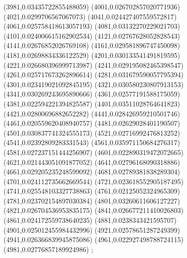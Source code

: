 {(3981,0.03435722855488059)
(4001,0.026702857020771936)
(4021,0.0299706567067073)
(4041,0.024427407559572817)
(4061,0.025758418613057193)
(4081,0.03132270229021703)
(4101,0.024006615162902534)
(4121,0.02767628052828543)
(4141,0.02676852026769108)
(4161,0.029581896747450098)
(4181,0.02698834336122529)
(4201,0.030133541491819595)
(4221,0.026680396999713987)
(4241,0.029195082465398547)
(4261,0.025717673262896614)
(4281,0.031679590057795394)
(4301,0.023419021092845195)
(4321,0.030580230807913153)
(4341,0.030269243695890666)
(4361,0.02577191588175059)
(4381,0.022594221394825587)
(4401,0.03511028764641823)
(4421,0.02800696882652282)
(4441,0.028426959210501746)
(4461,0.020559620408940757)
(4481,0.02629028401190507)
(4501,0.030837741324555173)
(4521,0.02716992476813252)
(4541,0.02392809283331543)
(4561,0.035971150684276317)
(4581,0.027237151444256907)
(4601,0.022890319472072665)
(4621,0.021443051091877052)
(4641,0.02796168090318886)
(4661,0.029205235248599092)
(4681,0.02789381838289304)
(4701,0.024112735662669544)
(4721,0.023618552905187495)
(4741,0.025548103327738863)
(4761,0.02125052324965309)
(4781,0.023702154897030384)
(4801,0.03260611606127227)
(4821,0.026704536953835175)
(4841,0.026677211410026803)
(4861,0.024172559738640235)
(4881,0.0238343421595707)
(4901,0.025012455984432996)
(4921,0.02578651287249399)
(4941,0.026366839945875086)
(4961,0.022927498788724115)
(4981,0.02776857189924986)
};
